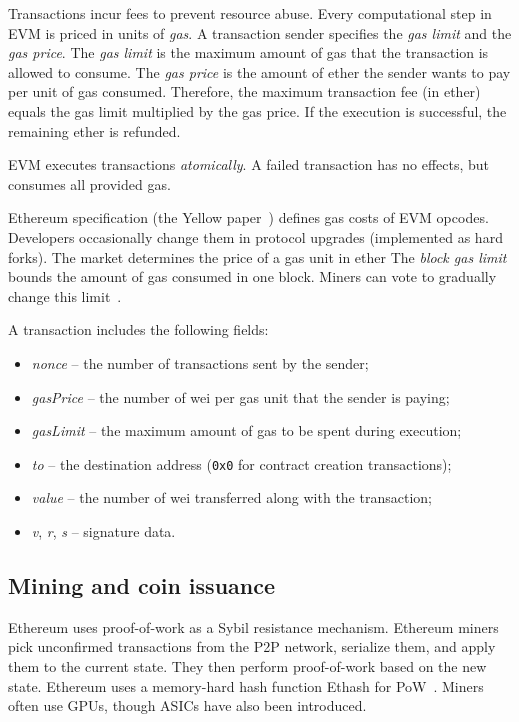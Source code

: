 Transactions incur fees to prevent resource abuse.
Every computational step in EVM is priced in units of \emph{gas}.
A transaction sender specifies the \textit{gas limit} and the \textit{gas price}.
The \textit{gas limit} is the maximum amount of gas that the transaction is allowed to consume.
The \textit{gas price} is the amount of ether the sender wants to pay per unit of gas consumed.
Therefore, the maximum transaction fee (in ether) equals the gas limit multiplied by the gas price.
If the execution is successful, the remaining ether is refunded.

EVM executes transactions \textit{atomically}.
A failed transaction has no effects, but consumes all provided gas.

Ethereum specification (the Yellow paper~\cite{Wood2014}) defines gas costs of EVM opcodes.
Developers occasionally change them in protocol upgrades (implemented as hard forks).
The market determines the price of a gas unit in ether
The \textit{block gas limit} bounds the amount of gas consumed in one block.
Miners can vote to gradually change this limit~\cite{Jnnk15}.

A transaction includes the following fields:
\begin{itemize}
	\item \emph{nonce} -- the number of transactions sent by the sender;
	\item \emph{gasPrice} -- the number of wei per gas unit that the sender is paying;
	\item \emph{gasLimit} -- the maximum amount of gas to be spent during execution;
	\item \emph{to} -- the destination address (\texttt{0x0} for contract creation transactions);
	\item \emph{value} -- the number of wei transferred along with the transaction;
	\item \emph{v}, \emph{r}, \emph{s} -- signature data.
\end{itemize}



\subsection{Mining and coin issuance}

Ethereum uses proof-of-work as a Sybil resistance mechanism.
Ethereum miners pick unconfirmed transactions from the P2P network, serialize them, and apply them to the current state.
They then perform proof-of-work based on the new state.
Ethereum uses a memory-hard hash function Ethash for PoW~\cite{Ethash}.
Miners often use GPUs, though ASICs have also been introduced.

